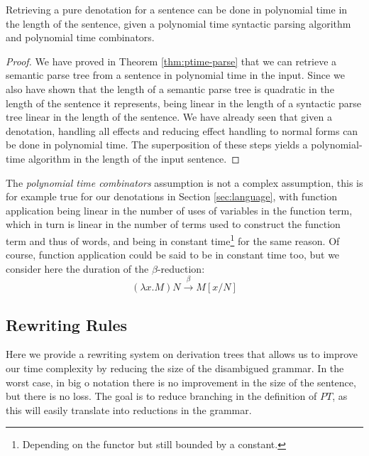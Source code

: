 \begin{thm}
	\label{thm:ptime-denot}
	Retrieving a pure denotation for a sentence can be done in polynomial time in
	the length of the sentence, given a polynomial time syntactic parsing
	algorithm and polynomial time combinators.
\end{thm}
\begin{proof}
	We have proved in Theorem \ref{thm:ptime-parse} that we can retrieve a
	semantic parse tree from a	sentence in polynomial time in the input.
	Since we also have shown that the length of a semantic parse tree is quadratic
	in the length of the sentence it represents, being linear in the length of a
	syntactic parse tree linear in the length of the sentence.
	We have already seen that given a denotation, handling all effects and
	reducing effect handling to normal forms can be done in polynomial time.
	The superposition of these steps yields a polynomial-time algorithm in the
	length of the input sentence.
\end{proof}

The \emph{polynomial time combinators} assumption is not a complex assumption,
this is for example true for our denotations in Section \ref{sec:language},
with function application being linear in the number of uses of variables in
the function term, which in turn is linear in the number of terms used to
construct the function term and thus of words, and \fmap being in constant
time\footnote{Depending on the functor but still bounded by a constant.} for
the same reason.
Of course, function application could be said to be in constant time too, but
we consider here the duration of the $\beta$-reduction:
\begin{equation*}
	\left(\lambda x. M\right)N \xrightarrow{\beta} M\left[x / N\right]
\end{equation*}

\subsection{Rewriting Rules}
\label{subsec:rewrite}
Here we provide a rewriting system on derivation trees that allows us to
improve our time complexity by reducing the size of the disambigued grammar.
In the worst case, in big o notation there is no improvement in the size of the
sentence, but there is no loss.
The goal is to reduce branching in the definition of $PT$, as this will easily
translate into reductions in the grammar.

\medskip

